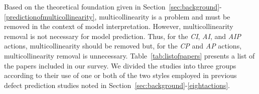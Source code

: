 Based on the theoretical foundation given in Section~\ref{sec:background}-\ref{predictionofmulticollinearity}, multicollinearity is a problem and must be removed in the context of model interpretation. However, multicollinearity removal is not necessary for model prediction. Thus, for the \textit{CI}, \textit{AI}, and \textit{AIP} actions, multicollinearity should be removed but, for the \textit{CP} and \textit{AP} actions, multicollinearity removal is unnecessary.
Table~\ref{tab:listofpapers} presents a list of the papers included in our survey.
We divided the studies into three groups according to their use of one or both of the two styles employed in previous defect prediction studies noted in Section~\ref{sec:background}-\ref{eightactions}.
